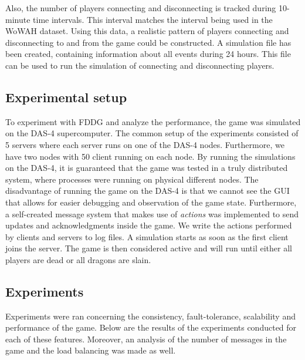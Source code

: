 Also, the number of players connecting and disconnecting is tracked during 10-minute time intervals.
This interval matches the interval being used in the WoWAH dataset.
Using this data, a realistic pattern of players connecting and disconnecting to and from the game could be constructed.
A simulation file has been created, containing information about all events during 24 hours. This file can be used to run the simulation of connecting and disconnecting players.

\subsection{Experimental setup}
\label{subsec:experimental_setup}

To experiment with FDDG and analyze the performance, the game was simulated on the DAS-4 supercomputer.
The common setup of the experiments consisted of 5 servers where each server runs on one of the DAS-4 nodes. Furthermore, we have two nodes with 50 client running on each node.
By running the simulations on the DAS-4, it is guaranteed that the game was tested in a truly distributed system, where processes were running on physical different nodes.
The disadvantage of running the game on the DAS-4 is that we cannot see the GUI that allows for easier debugging and observation of the game state.
Furthermore, a self-created message system that makes use of \emph{actions} was implemented to send updates and acknowledgments inside the game. We write the actions performed by clients and servers to log files.
A simulation starts as soon as the first client joins the server. The game is then considered active and will run until either all players are dead or all dragons are slain.


\subsection{Experiments}
\label{subsec:experiments}
	Experiments were ran concerning the consistency, fault-tolerance, scalability and performance of the game. Below are the results of the experiments conducted for each of these features. Moreover, an analysis of the number of messages in the game and the load balancing was made as well.

